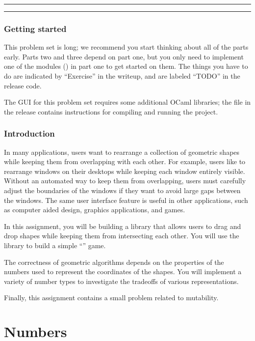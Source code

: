 \documentclass{pset}
\begin{document}
\maketitle

\standardinstructions

\medskip
\hrule
\hrule
\section*{Getting started}
This problem set is long; we recommend you start thinking about all of the
parts early.  Parts two and three depend on part one, but you only need to
implement one of the modules () in part one to get started on them.
The things you have to do are indicated by ``Exercise'' in the writeup, and
are labeled ``TODO'' in the release code.

The GUI for this problem set requires some additional OCaml libraries; the file
 in the release contains instructions for compiling and
running the project.

\pagebreak
\section*{Introduction}
In many applications, users want to rearrange a collection of geometric shapes
while keeping them from overlapping with each other.  For example, users like
to rearrange windows on their desktops while keeping each window entirely
visible.  Without an automated way to keep them from overlapping, users must
carefully adjust the boundaries of the windows if they want to avoid large gaps
between the windows.  The same user interface feature is useful in other
applications, such as computer aided design, graphics applications, and games.

In this assignment, you will be building a library that allows users to drag and
drop shapes while keeping them from intersecting each other.  You will use the
library to build a simple
``'' game.

The correctness of geometric algorithms depends on the properties of the numbers
used to represent the coordinates of the shapes.  You will implement a variety
of number types to investigate the tradeoffs of various representations.

Finally, this assignment contains a small problem related to mutability.

\part{Numbers}
\end{document}
